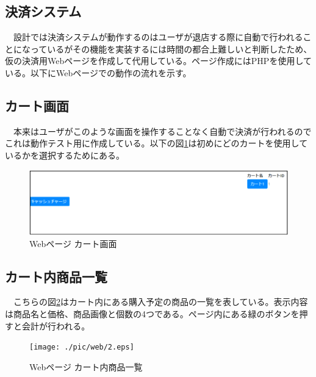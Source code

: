 \subsection*{決済システム}
　設計では決済システムが動作するのはユーザが退店する際に自動で行われることになっているがその機能を実装するには時間の都合上難しいと判断したため、仮の決済用Webページを作成して代用している。ページ作成にはPHPを使用している。以下にWebページでの動作の流れを示す。

\subsection*{カート画面}
　本来はユーザがこのような画面を操作することなく自動で決済が行われるのでこれは動作テスト用に作成している。以下の図\ref{web_cart}は初めにどのカートを使用しているかを選択するためにある。
\begin{figure}[htbp]
\centering
\includegraphics[width=15cm]{./pic/web/1.eps}
\caption{Webページ カート画面}
\label{web_cart}
\end{figure}

\subsection*{カート内商品一覧}
　こちらの図\ref{web_cart_items}はカート内にある購入予定の商品の一覧を表している。表示内容は商品名と価格、商品画像と個数の4つである。ページ内にある緑のボタンを押すと会計が行われる。
\begin{figure}[htbp]
\centering
\texttt{[image: ./pic/web/2.eps]}
\caption{Webページ カート内商品一覧}
\label{web_cart_items}
\end{figure}

